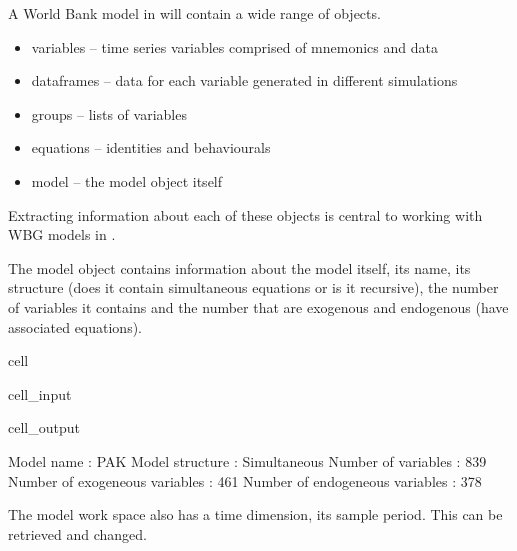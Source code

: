 \documentclass[letterpaper,10pt,english]{jupyterBook}
\begin{document}
\sphinxAtStartPar
A World Bank model in  will contain a wide range of objects.
\begin{itemize}
\item {} 
\sphinxAtStartPar
variables  – time series variables comprised of mnemonics and data

\item {} 
\sphinxAtStartPar
dataframes – data for each variable generated in  different simulations

\item {} 
\sphinxAtStartPar
groups     – lists of variables

\item {} 
\sphinxAtStartPar
equations  – identities and behaviourals

\item {} 
\sphinxAtStartPar
model      – the model object itself

\end{itemize}

\sphinxAtStartPar
Extracting information about each of these objects is central to working with WBG models in .

\sphinxAtStartPar
The model object contains information about the model itself, its name, its structure (does it contain simultaneous equations or is it recursive), the number of variables it contains and the number that are exogenous and endogenous (have associated equations).

\begin{sphinxuseclass}{cell}\begin{sphinxVerbatimInput}

\begin{sphinxuseclass}{cell_input}
\begin{sphinxVerbatim}[commandchars=\\\{\}]
\end{sphinxVerbatim}

\end{sphinxuseclass}\end{sphinxVerbatimInput}
\begin{sphinxVerbatimOutput}

\begin{sphinxuseclass}{cell_output}
\begin{sphinxVerbatim}[commandchars=\\\{\}]
\PYGZlt{}
Model name                              :                  PAK 
Model structure                         :         Simultaneous 
Number of variables                     :                  839 
Number of exogeneous  variables         :                  461 
Number of endogeneous variables         :                  378 
\PYGZgt{}
\end{sphinxVerbatim}

\end{sphinxuseclass}\end{sphinxVerbatimOutput}

\end{sphinxuseclass}
\sphinxAtStartPar
The model work space also has a time dimension, its sample period.  This can be retrieved and changed.
\end{document}
